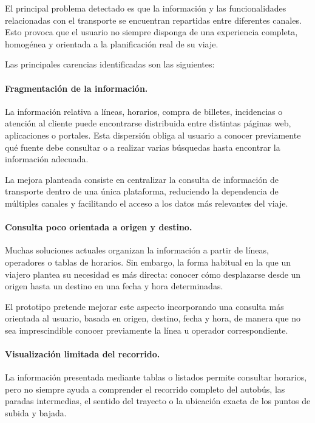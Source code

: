 El principal problema detectado es que la información y las funcionalidades relacionadas con el transporte se encuentran repartidas entre diferentes canales. Esto provoca que el usuario no siempre disponga de una experiencia completa, homogénea y orientada a la planificación real de su viaje.

Las principales carencias identificadas son las siguientes:

\paragraph{Fragmentación de la información.}
La información relativa a líneas, horarios, compra de billetes, incidencias o atención al cliente puede encontrarse distribuida entre distintas páginas web, aplicaciones o portales. Esta dispersión obliga al usuario a conocer previamente qué fuente debe consultar o a realizar varias búsquedas hasta encontrar la información adecuada.

La mejora planteada consiste en centralizar la consulta de información de transporte dentro de una única plataforma, reduciendo la dependencia de múltiples canales y facilitando el acceso a los datos más relevantes del viaje.

\paragraph{Consulta poco orientada a origen y destino.}
Muchas soluciones actuales organizan la información a partir de líneas, operadores o tablas de horarios. Sin embargo, la forma habitual en la que un viajero plantea su necesidad es más directa: conocer cómo desplazarse desde un origen hasta un destino en una fecha y hora determinadas.

El prototipo pretende mejorar este aspecto incorporando una consulta más orientada al usuario, basada en origen, destino, fecha y hora, de manera que no sea imprescindible conocer previamente la línea u operador correspondiente.

\paragraph{Visualización limitada del recorrido.}
La información presentada mediante tablas o listados permite consultar horarios, pero no siempre ayuda a comprender el recorrido completo del autobús, las paradas intermedias, el sentido del trayecto o la ubicación exacta de los puntos de subida y bajada.

